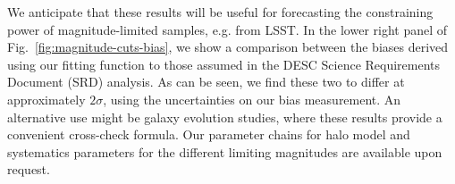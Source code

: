\documentclass[a4paper,11pt]{article}
\begin{document}
    We anticipate that these results will be useful for forecasting the constraining power of magnitude-limited samples, e.g. from LSST. In the lower right panel of Fig.~\ref{fig:magnitude-cuts-bias}, we show a comparison between the biases derived using our fitting function to those assumed in the DESC Science Requirements Document (SRD) analysis. As can be seen, we find these two to differ at approximately $2 \sigma$, using the uncertainties on our bias measurement. An alternative use might be galaxy evolution studies, where these results provide a convenient cross-check formula. Our parameter chains for halo model and systematics parameters for the different limiting magnitudes are available upon request. 
\end{document}
